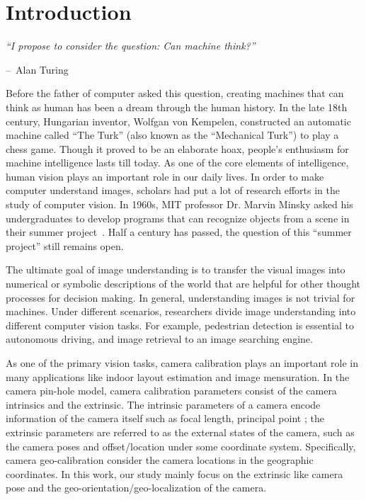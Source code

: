 \chapter{Introduction}
\label{chap:intro}

\makeatletter
\newenvironment{chapquote}[2][2em]
{\setlength{\@tempdima}{#1} \def\chapquote@author{#2} \parshape 1
  \@tempdima \dimexpr\textwidth-2\@tempdima\relax \itshape}
{\par\normalfont\hfill--\
\chapquote@author\hspace*{\@tempdima}\par\bigskip}
\makeatother

\begin{chapquote}{Alan Turing}
  ``I propose to consider the question: Can machine think?''
\end{chapquote}

Before the father of computer asked this question, creating
machines that can think as human has been a dream through the human
history. In the late 18th century, Hungarian inventor, Wolfgan von
Kempelen, constructed an automatic machine called ``The Turk'' (also
known as the ``Mechanical Turk'') to play a chess game. Though it
proved to be an elaborate hoax, people's enthusiasm for machine
intelligence lasts till today. As one of the core elements of
intelligence, human vision plays an important role in our daily lives.
In order to make computer understand images, scholars had put a lot of
research efforts in the study of computer vision. In 1960s, MIT
professor Dr. Marvin Minsky asked his undergraduates to develop
programs that can recognize objects from a scene in their summer
project~\cite{boden2006mind}. Half a century has passed, the question
of this ``summer project'' still remains open.

The ultimate goal of image understanding is to transfer the visual
images into numerical or symbolic descriptions of the world
that are helpful for other thought processes for decision making.
In general, understanding images is not trivial for machines.
Under different scenarios, researchers divide image
understanding into different computer vision tasks. For example,
pedestrian detection is essential to autonomous driving, and image
retrieval to an image searching engine.

As one of the primary vision tasks, camera calibration plays an
important role in many applications like indoor layout estimation and
image mensuration. 
In the camera pin-hole model, camera calibration parameters consist of
the camera intrinsics and the extrinsic. The intrinsic parameters of
a camera encode information of the camera itself such as focal length,
principal point \etc; the extrinsic parameters are referred to as the
external states of the camera, such as the camera poses and
offset/location under some coordinate system. Specifically,
camera geo-calibration consider the camera locations in the geographic
coordinates.
In this work, our study mainly focus on the extrinsic like camera pose
and the geo-orientation/geo-localization of the camera.
 
